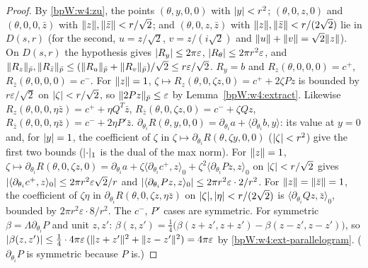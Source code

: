 \begin{proof}
\label{stepW:w4:testpts}
By \eqref{bpW:w4:zu}, the points $(\theta,y,0,0)$ with $\lvert y\rvert<r^2$; $(\theta,0,z,0)$ and $(\theta,0,0,\bar z)$ with
$\lVert z\rVert,\lVert \bar z\rVert<r/\sqrt2$; and $(\theta,0,z,\bar z)$ with $\lVert z\rVert,\lVert \bar z\rVert<r/(2\sqrt2)$ lie in $D(s,r)$
(for the second, $u=z/\sqrt2$, $v=z/(i\sqrt2)$ and $\lVert u\rVert+\lVert v\rVert=\sqrt2\lVert z\rVert$). On $D(s,r)$ the hypothesis gives
$\lvert R_y\rvert\le2\pi\varepsilon$, $\lvert R_\theta\rvert\le2\pi r^2\varepsilon$, and
$\lVert R_z\rVert_{\bar p},\lVert R_{\bar z}\rVert_{\bar p}\le(\lVert R_u\rVert_{\bar p}+\lVert R_v\rVert_{\bar p})/\sqrt2\le r\varepsilon/\sqrt2$.
\label{stepW:w4:first}
$R_y=b$ and $R_z(\theta,0,0,0)=c^+$, $R_{\bar z}(\theta,0,0,0)=c^-$. For $\lVert z\rVert=1$,
$\zeta\mapsto R_z(\theta,0,\zeta z,0)=c^++2\zeta Pz$ is bounded by $r\varepsilon/\sqrt2$ on $\lvert \zeta\rvert<r/\sqrt2$, so
$\lVert 2Pz\rVert_{\bar p}\le\varepsilon$ by Lemma~\ref{bpW:w4:extract}. Likewise $R_z(\theta,0,0,\eta\bar z)=c^++\eta Q^T\bar z$,
$R_{\bar z}(\theta,0,\zeta z,0)=c^-+\zeta Qz$, $R_{\bar z}(\theta,0,0,\eta\bar z)=c^-+2\eta P'\bar z$.
\label{stepW:w4:angle}
$\partial_{\theta_i}R(\theta,y,0,0)=\partial_{\theta_i}a+\langle\partial_{\theta_i}b,y\rangle$: its value at $y=0$ and, for
$\lvert y\rvert=1$, the coefficient of $\zeta$ in $\zeta\mapsto\partial_{\theta_i}R(\theta,\zeta y,0,0)$ ($\lvert \zeta\rvert<r^2$) give the
first two bounds ($\lvert \cdot\rvert_1$ is the dual of the max norm). For $\lVert z\rVert=1$,
$\zeta\mapsto\partial_{\theta_i}R(\theta,0,\zeta z,0)=\partial_{\theta_i}a+\zeta\langle\partial_{\theta_i}c^+,z\rangle_0+\zeta^2\langle\partial_{\theta_i}Pz,z\rangle_0$
on $\lvert \zeta\rvert<r/\sqrt2$ gives $\lvert \langle\partial_{\theta_i}c^+,z\rangle_0\rvert\le2\pi r^2\varepsilon\sqrt2/r$ and
$\lvert \langle\partial_{\theta_i}Pz,z\rangle_0\rvert\le2\pi r^2\varepsilon\cdot2/r^2$. For $\lVert z\rVert=\lVert \bar z\rVert=1$, the coefficient of
$\zeta\eta$ in $\partial_{\theta_i}R(\theta,0,\zeta z,\eta\bar z)$ on $\lvert \zeta\rvert,\lvert \eta\rvert<r/(2\sqrt2)$ is
$\langle\partial_{\theta_i}Qz,\bar z\rangle_0$, bounded by $2\pi r^2\varepsilon\cdot8/r^2$. The $c^-$, $P'$ cases are symmetric.
\label{stepW:w4:polar}
For symmetric $\beta=\Lambda\partial_{\theta_i}P$ and unit $z,z'$:
$\beta(z,z')=\frac14\bigl(\beta(z+z',z+z')-\beta(z-z',z-z')\bigr)$, so
$\lvert \beta(z,z')\rvert\le\frac14\cdot4\pi\varepsilon\,(\lVert z+z'\rVert^2+\lVert z-z'\rVert^2)=4\pi\varepsilon$ by
\ref{bpW:w4:ext-parallelogram}. ($\partial_{\theta_i}P$ is symmetric because $P$ is.)
\end{proof}


